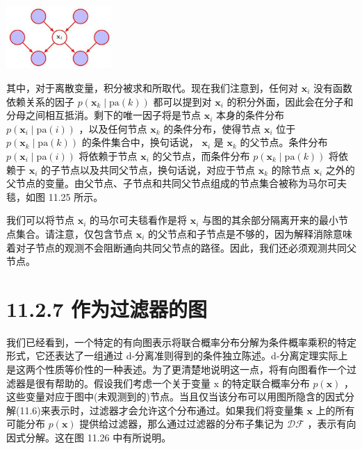 \documentclass[10pt]{report}
\begin{document}
\begin{center}
\includegraphics[max width=0.3\textwidth]{images/0194e279-9b28-703a-88f4-c3ac21e2010d_367_1097_343_458_274_0.jpg}
\end{center}
\hspace*{3em} 

其中，对于离散变量，积分被求和所取代。现在我们注意到，任何对 \({\mathbf{x}}_{i}\) 没有函数依赖关系的因子 \(p\left( {{\mathbf{x}}_{k} \mid  \mathrm{{pa}}\left( k\right) }\right)\) 都可以提到对 \({\mathbf{x}}_{i}\) 的积分外面，因此会在分子和分母之间相互抵消。剩下的唯一因子将是节点 \({\mathbf{x}}_{i}\) 本身的条件分布 \(p\left( {{\mathbf{x}}_{i} \mid  \mathrm{{pa}}\left( i\right) }\right)\) ，以及任何节点 \({\mathbf{x}}_{k}\) 的条件分布，使得节点 \({\mathbf{x}}_{i}\) 位于 \(p\left( {{\mathbf{x}}_{k} \mid  \mathrm{{pa}}\left( k\right) }\right)\) 的条件集合中，换句话说， \({\mathbf{x}}_{i}\) 是 \({\mathbf{x}}_{k}\) 的父节点。条件分布 \(p\left( {{\mathbf{x}}_{i} \mid  \mathrm{{pa}}\left( i\right) }\right)\) 将依赖于节点 \({\mathbf{x}}_{i}\) 的父节点，而条件分布 \(p\left( {{\mathbf{x}}_{k} \mid  \mathrm{{pa}}\left( k\right) }\right)\) 将依赖于 \({\mathbf{x}}_{i}\) 的子节点以及共同父节点，换句话说，对应于节点 \({\mathbf{x}}_{k}\) 的除节点 \({\mathbf{x}}_{i}\) 之外的父节点的变量。由父节点、子节点和共同父节点组成的节点集合被称为马尔可夫毯，如图 11.25 所示。

我们可以将节点 \({\mathbf{x}}_{i}\) 的马尔可夫毯看作是将 \({\mathbf{x}}_{i}\) 与图的其余部分隔离开来的最小节点集合。请注意，仅包含节点 \({\mathbf{x}}_{i}\) 的父节点和子节点是不够的，因为解释消除意味着对子节点的观测不会阻断通向共同父节点的路径。因此，我们还必须观测共同父节点。

\section*{11.2.7 作为过滤器的图}

我们已经看到，一个特定的有向图表示将联合概率分布分解为条件概率乘积的特定形式，它还表达了一组通过 d-分离准则得到的条件独立陈述。d-分离定理实际上是这两个性质等价性的一种表述。为了更清楚地说明这一点，将有向图看作一个过滤器是很有帮助的。假设我们考虑一个关于变量 \(\mathrm{x}\) 的特定联合概率分布 \(p\left( \mathbf{x}\right)\) ，这些变量对应于图中(未观测到的)节点。当且仅当该分布可以用图所隐含的因式分解(11.6)来表示时，过滤器才会允许这个分布通过。如果我们将变量集 \(\mathbf{x}\) 上的所有可能分布 \(p\left( \mathbf{x}\right)\) 提供给过滤器，那么通过过滤器的分布子集记为 \(\mathcal{D}\mathcal{F}\) ，表示有向因式分解。这在图 11.26 中有所说明。
\end{document}
